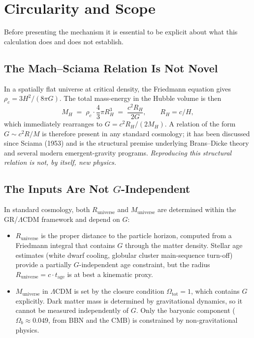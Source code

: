 \documentclass[11pt,letterpaper]{article}
\newcommand{\Runiv}{R_{\mathrm{universe}}}
\newcommand{\Muniv}{M_{\mathrm{universe}}}
\begin{document}
\section{Circularity and Scope}
\label{sec:scope}

Before presenting the mechanism it is essential to be explicit about
what this calculation does and does not establish.

\subsection{The Mach--Sciama Relation Is Not Novel}

In a spatially flat universe at critical density, the Friedmann equation
gives $\rho_c = 3 H^2/(8\pi G)$. The total mass-energy in the Hubble
volume is then
\begin{equation}
  M_H \;=\; \rho_c \cdot \frac{4}{3}\pi R_H^3
       \;=\; \frac{c^2 R_H}{2 G},
       \qquad R_H = c/H,
\end{equation}
which immediately rearranges to $G = c^2 R_H/(2 M_H)$. A relation of the
form $G \sim c^2 R/M$ is therefore present in any standard cosmology;
it has been discussed since Sciama (1953) and is the structural premise
underlying Brans--Dicke theory and several modern emergent-gravity
programs. \emph{Reproducing this structural relation is not, by itself,
new physics.}

\subsection{The Inputs Are Not $G$-Independent}

In standard cosmology, both $\Runiv$ and $\Muniv$ are determined within
the GR/$\Lambda$CDM framework and depend on $G$:

\begin{itemize}
  \item $\Runiv$ is the proper distance to the particle horizon, computed
    from a Friedmann integral that contains $G$ through the matter
    density. Stellar age estimates (white dwarf cooling, globular cluster
    main-sequence turn-off) provide a partially $G$-independent age
    constraint, but the radius $\Runiv = c \cdot t_{\mathrm{age}}$ is at
    best a kinematic proxy.
  \item $\Muniv$ in $\Lambda$CDM is set by the closure condition
    $\Omega_{\mathrm{tot}} = 1$, which contains $G$ explicitly. Dark
    matter mass is determined by gravitational dynamics, so it cannot
    be measured independently of $G$. Only the baryonic component
    ($\Omega_b \approx 0.049$, from BBN and the CMB) is constrained
    by non-gravitational physics.
\end{itemize}
\end{document}
